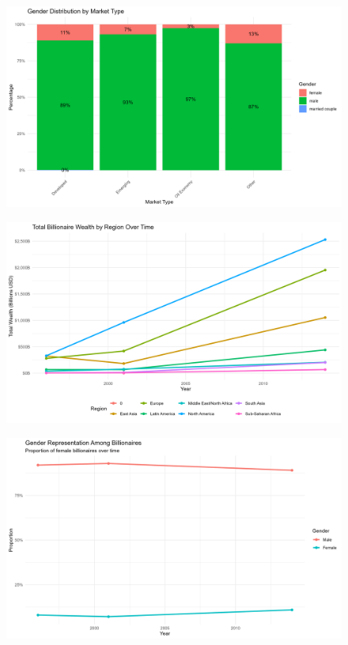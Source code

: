 \documentclass[
  man,floatsintext]{apa6}
\begin{document}
\begin{figure}
\includegraphics[width=0.9\linewidth]{../Question4/Results/marketgender} \caption{ }\label{fig:marketgender-image}
\end{figure}

\begin{figure}
\includegraphics[width=0.9\linewidth]{../Question4/Results/regional} \caption{ }\label{fig:regional-image}
\end{figure}

\begin{figure}
\includegraphics[width=0.9\linewidth]{../Question4/Results/genderage} \caption{ }\label{fig:genderage-image}
\end{figure}
\end{document}
